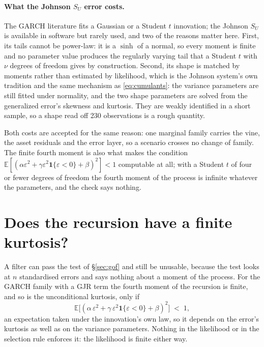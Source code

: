 \documentclass[11pt]{article}
\begin{document}
\paragraph{What the Johnson \texorpdfstring{$S_U$}{SU} error costs.} The
GARCH literature fits a Gaussian or a Student $t$ innovation; the Johnson
$S_U$ is available in software but rarely used, and two of the reasons matter
here. First, its tails cannot be power-law: it is a $\sinh$ of a normal, so
every moment is finite and no parameter value produces the regularly varying
tail that a Student $t$ with $\nu$ degrees of freedom gives by construction.
Second, its shape is matched by moments rather than estimated by likelihood,
which is the Johnson system's own tradition and the same mechanism as
\eqref{eq:cumulants}: the variance parameters are still fitted under
normality, and the two shape parameters are solved from the generalized
error's skewness and kurtosis. They are weakly identified in a short sample,
so a shape read off 230 observations is a rough quantity.

Both costs are accepted for the same reason: one marginal family carries the
vine, the asset residuals and the error layer, so a scenario crosses no change
of family. The finite fourth moment is also what makes the condition
$\mathbb E[(\alpha \varepsilon^2 + \gamma \varepsilon^2 \mathbf 1\{\varepsilon < 0\}
+ \beta)^2] < 1$ computable at all; with a Student $t$ of four or fewer degrees
of freedom the fourth moment of the process is infinite whatever the
parameters, and the check says nothing.

\section{Does the recursion have a finite kurtosis?}\label{sec:fourth}

A filter can pass the test of \S\ref{sec:gof} and still be unusable, because
the test looks at $n$ standardised errors and says nothing about a moment of
the process. For the GARCH family with a GJR term the fourth moment of the
recursion is finite, and so is the unconditional kurtosis, only if
\begin{equation}\label{eq:fourth_moment}
  \mathbb E\big[(\alpha\,\varepsilon^2
   + \gamma\,\varepsilon^2 \mathbf 1\{\varepsilon < 0\} + \beta)^2\big] \;<\; 1 ,
\end{equation}
an expectation taken under the innovation's own law, so it depends on the
error's kurtosis as well as on the variance parameters. Nothing in the
likelihood or in the selection rule enforces it: the likelihood is finite
either way.
\end{document}
